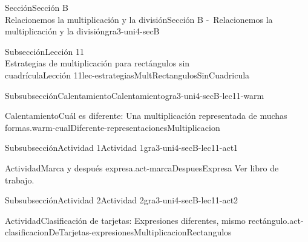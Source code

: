 \begin{sectionptx}{Sección}{{\Large Sección B\\}Relacionemos la multiplicación y la división}{}{Sección B -~Relacionemos la multiplicación y la división}{}{}{gra3-uni4-secB}
\begin{subsectionptx}{Subsección}{{\normalsize Lección 11\\[-0.05cm]}Estrategias de multiplicación para rectángulos sin\\cuadrícula}{}{Lección 11}{}{}{lec-estrategiasMultRectangulosSinCuadricula}
\begin{subsubsectionptx}{Subsubsección}{Calentamiento}{}{Calentamiento}{}{}{gra3-uni4-secB-lec11-warm}
\begin{exploration}{Calentamiento}{Cuál es diferente: Una multiplicación representada de muchas formas.}{warm-cualDiferente-representacionesMultiplicacion}
\end{exploration}%
\end{subsubsectionptx}
%
%
\typeout{************************************************}
\typeout{************************************************}
%
\begin{subsubsectionptx}{Subsubsección}{Actividad 1}{}{Actividad 1}{}{}{gra3-uni4-secB-lec11-act1}
\begin{activity}{Actividad}{Marca y después expresa.}{act-marcaDespuesExpresa}%
Ver libro de trabajo.
\end{activity}%
\end{subsubsectionptx}
%
%
\typeout{************************************************}
\typeout{************************************************}
%
\begin{subsubsectionptx}{Subsubsección}{Actividad 2}{}{Actividad 2}{}{}{gra3-uni4-secB-lec11-act2}
\begin{activity}{Actividad}{Clasificación de tarjetas: Expresiones diferentes, mismo rectángulo.}{act-clasificacionDeTarjetas-expresionesMultiplicacionRectangulos}%

\end{activity}
\end{subsubsectionptx}
\end{subsectionptx}
\end{sectionptx}
